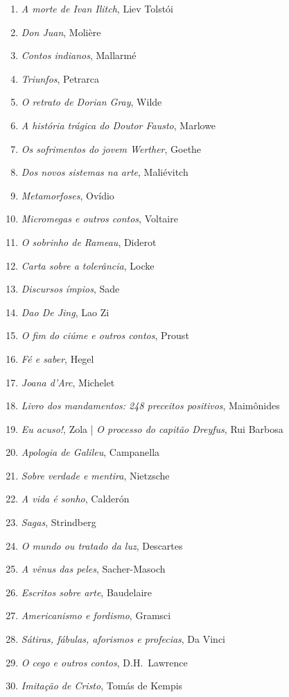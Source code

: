\begin{enumerate}
\item \textit{A morte de Ivan Ilitch}, Liev Tolstói
\item \textit{Don Juan}, Molière
\item \textit{Contos indianos}, Mallarmé
\item \textit{Triunfos}, Petrarca
\item \textit{O retrato de Dorian Gray}, Wilde
\item \textit{A história trágica do Doutor Fausto}, Marlowe
\item \textit{Os sofrimentos do jovem Werther}, Goethe
\item \textit{Dos novos sistemas na arte}, Maliévitch
\item \textit{Metamorfoses}, Ovídio
\item \textit{Micromegas e outros contos}, Voltaire
\item \textit{O sobrinho de Rameau}, Diderot
\item \textit{Carta sobre a tolerância}, Locke
\item \textit{Discursos ímpios}, Sade
\item \textit{Dao De Jing}, Lao Zi
\item \textit{O fim do ciúme e outros contos}, Proust
\item \textit{Fé e saber}, Hegel
\item \textit{Joana d'Arc}, Michelet
\item \textit{Livro dos mandamentos: 248 preceitos positivos}, Maimônides
\item \textit{Eu acuso!}, Zola | \textit{O processo do capitão Dreyfus}, Rui Barbosa
\item \textit{Apologia de Galileu}, Campanella 
\item \textit{Sobre verdade e mentira}, Nietzsche
\item \textit{A vida é sonho}, Calderón
\item \textit{Sagas}, Strindberg
\item \textit{O mundo ou tratado da luz}, Descartes
\item \textit{A vênus das peles}, Sacher{}-Masoch
\item \textit{Escritos sobre arte}, Baudelaire
\item \textit{Americanismo e fordismo}, Gramsci
\item \textit{Sátiras, fábulas, aforismos e profecias}, Da Vinci
\item \textit{O cego e outros contos}, D.H.~Lawrence
\item \textit{Imitação de Cristo}, Tomás de Kempis

\end{enumerate}
